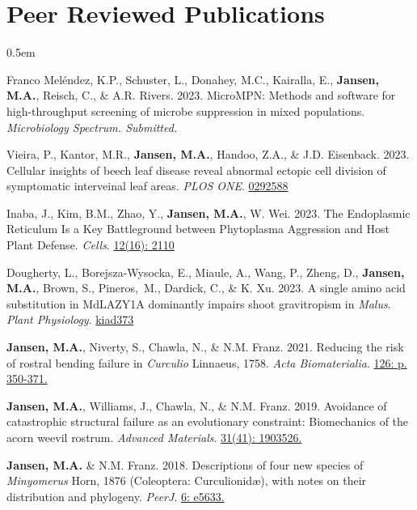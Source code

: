 \documentclass[12pt,a4paper]{article}
\begin{document}
\section*{Peer Reviewed Publications}
	\begin{description}
		\itemsep 0.5em
		
		\item Franco Mel\'{e}ndez, K.P., Schuster, L., Donahey, M.C., Kairalla, E., \textbf{Jansen, M.A.}, Reisch, C., \& A.R. Rivers. 2023. MicroMPN: Methods and software for high-throughput screening of microbe suppression in mixed populations. \textit{Microbiology Spectrum. Submitted.}
		
		\item Vieira, P., Kantor, M.R., \textbf{Jansen, M.A.}, Handoo, Z.A., \& J.D. Eisenback. 2023. Cellular insights of beech leaf disease reveal abnormal ectopic cell division of symptomatic interveinal leaf areas. \textit{PLOS ONE}. \href{https://doi.org/10.1371/journal.pone.0292588}{0292588}
		
		\item Inaba, J., Kim, B.M., Zhao, Y., \textbf{Jansen, M.A.}, W. Wei. 2023. The Endoplasmic Reticulum Is a Key Battleground between Phytoplasma Aggression and Host Plant Defense. \textit{Cells}. \href{https://doi.org/10.3390/cells12162110}{12(16): 2110}
		
		\item Dougherty, L., Borejsza-Wysocka, E., Miaule, A., Wang, P., Zheng, D., \textbf{Jansen, M.A.}, Brown, S., Pineros,~M., Dardick, C., \& K. Xu. 2023. A single amino acid substitution in MdLAZY1A dominantly impairs shoot gravitropism in \textit{Malus}. \textit{Plant Physiology}. \href{https://doi.org/10.1093/plphys/kiad373}{kiad373}
		
		\item \textbf{Jansen, M.A.}, Niverty, S., Chawla, N., \& N.M. Franz. 2021. Reducing the risk of rostral bending failure in \textit{Curculio} Linnaeus, 1758. \textit{Acta Biomaterialia}. \href{https://doi.org/10.1016/j.actbio.2021.03.029}{126: p. 350-371.}
		
		\item \textbf{Jansen, M.A.}, Williams, J., Chawla, N., \& N.M. Franz. 2019. Avoidance of catastrophic structural failure as an evolutionary constraint: Biomechanics of the acorn weevil rostrum. \textit{Advanced Materials}. \href{https://doi.org/10.1002/adma.201903526}{31(41): 1903526.}
		
		\item \textbf{Jansen, M.A.} \& N.M. Franz. 2018. Descriptions of four new species of \textit{Minyomerus} Horn, 1876 (Coleoptera: Curculionid\ae), with notes on their distribution and phylogeny. \textit{PeerJ}. \href{https://peerj.com/articles/5633/}{6: e5633.}
		

\end{description}
\end{document}
